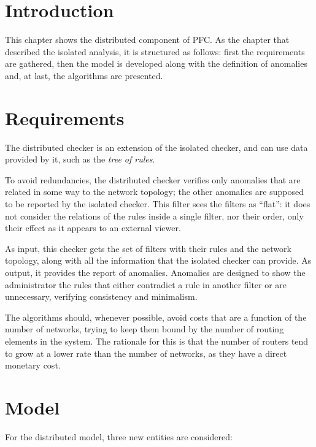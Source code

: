 
\section{Introduction}

This chapter shows the distributed component of PFC. As the chapter
that described the isolated analysis, it is structured as
follows: first the requirements are gathered, then the model is developed along
with the definition of anomalies and, at last, the algorithms are presented.



\section{Requirements}

\label{sec:req}

The distributed checker is an extension of the isolated checker, and can use
data provided by it, such as the \emph{tree of rules}.

To avoid redundancies, the distributed checker verifies only anomalies that are
related in some way to the network topology; the other anomalies are supposed to be
reported by the isolated checker. This filter sees the filters as ``flat'': it
does not consider the relations of the rules inside a single filter, nor their
order, only their effect as it appears to an external viewer.

As input, this checker gets the set of filters with their rules and the network
topology, along with all the information that the isolated
checker can provide. As output, it provides the report of anomalies.
Anomalies are designed to show the administrator the rules that either
contradict a rule in another filter or are unnecessary,
verifying consistency and minimalism.

The algorithms should, whenever possible, avoid costs that are a function of the
number of networks, trying to keep them bound by the number of routing elements
in the system. The rationale for this is that the number of routers tend to grow
at a lower rate than the number of networks, as they have a direct monetary
cost.



\section{Model}

For the distributed model, three new entities are considered:

